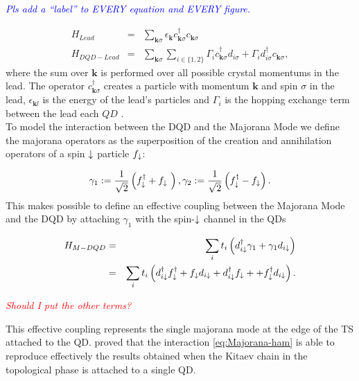 \documentclass[showpacs,aps,prb,reprint,superscriptaddress]{revtex4-1}
\newcommand{\LUIS}[1]{\textcolor{blue}{\fbox{Luis} {\sl#1}}}
\newcommand{\Jesus}[1]{\textcolor{red}{\fbox{Jesus} {\sl#1}}}
\begin{document}
\LUIS{Pls add a ``label'' to EVERY equation and EVERY figure.}

\begin{eqnarray*}
H_{Lead} & = & \sum_{\mathbf{k}\sigma }\epsilon_{\mathbf{k}}c_{\mathbf{k}\sigma }^{\dagger}c_{\mathbf{k}\sigma }\\
H_{DQD-Lead} & = &  \sum_{\mathbf{k}\sigma }\sum_{i\in\{1,2\}}\Gamma_i c_{\mathbf{k}\sigma }^{\dagger}d_{i\sigma}+\Gamma_i d_{i\sigma}^{\dagger}c_{\mathbf{k}\sigma },
\end{eqnarray*}
%
where the sum over $\mathbf{k}$ is performed over all possible crystal momentums in the lead. The operator $c_{\mathbf{k}\sigma }^{\dagger}$ creates a particle with momentum $\mathbf{k}$ and spin
$\sigma$ in the lead, $\epsilon_{\mathbf{k}l}$ is the energy
of the lead's particles and $\Gamma_i$ is the hopping exchange
term between the lead each $QD$ . \\

To model the interaction between the DQD and the Majorana Mode we define the majorana operators as the  superposition of the creation and annihilation operators of a spin $\downarrow$ particle $f_\downarrow$:

$$\gamma_1 := \frac{1}{\sqrt{2}} \left( f^\dagger_{\downarrow} + f_{\downarrow}\ \right) , \gamma_2 := \frac{1}{\sqrt{2}} \left( f^\dagger_{\downarrow} - f_{\downarrow} \right).$$
This makes possible to define an effective coupling between the Majorana Mode and the DQD by attaching $\gamma_1$ with the spin-$\downarrow$ channel in the QDs

\begin{eqnarray}
H_{M-DQD} & = &  \sum_{i}t_{i} \left(d_{i\downarrow}^{\dagger}\gamma_{1}+\gamma_{1}d_{i\downarrow}\right) \\
& = &  \sum_{i}t_{i} \left(d_{i\downarrow}^{\dagger}f^\dagger_{\downarrow} + 
f_{\downarrow}d_{i\downarrow} +d_{i\downarrow}^{\dagger}f_{\downarrow}+
+f_{\downarrow}^{\dagger} d_{i\downarrow}\right).
\label{eq:Majorana-ham}
\end{eqnarray}


\Jesus{Should I put the other terms? }


This effective coupling represents the single majorana mode at the edge of the TS attached to the QD. \citeauthor{ruiz-tijerina_interaction_2015}  proved that the interaction \eqref{eq:Majorana-ham} is able to reproduce effectively the results obtained when the Kitaev chain in the topological phase is attached to a single QD.  \\
 
\end{document}
